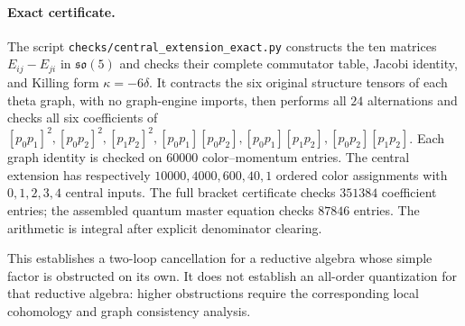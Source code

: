 \paragraph{Exact certificate.}
The script \texttt{checks/central\_extension\_exact.py} constructs the
ten matrices $E_{ij}-E_{ji}$ in $\mathfrak{so}(5)$ and checks their
complete commutator table, Jacobi identity, and Killing form
$\kappa=-6\delta$.  It contracts the six original structure tensors of
each theta graph, with no graph-engine imports, then performs all
$24$ alternations and checks all six coefficients of
$[p_0p_1]^2,[p_0p_2]^2,[p_1p_2]^2,
[p_0p_1][p_0p_2],[p_0p_1][p_1p_2],[p_0p_2][p_1p_2]$.
Each graph identity is checked on $60000$ color--momentum entries.
The central extension has respectively $10000,4000,600,40,1$
ordered color assignments with $0,1,2,3,4$ central inputs.
The full bracket certificate checks $351384$ coefficient entries;
the assembled quantum master equation checks $87846$ entries.
The arithmetic is integral after explicit denominator clearing.

This establishes a two-loop cancellation for a reductive algebra
whose simple factor is obstructed on its own.  It does not establish
an all-order quantization for that reductive algebra: higher
obstructions require the corresponding local cohomology and graph
consistency analysis.
